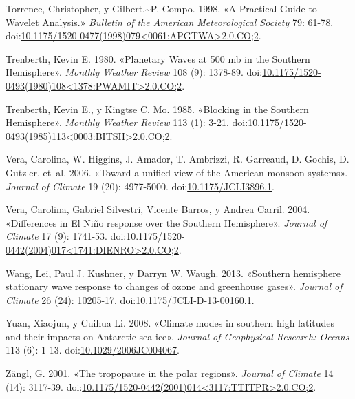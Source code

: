 \documentclass[spanish,a4paper,12p]{book}
\begin{document}
\hypertarget{ref-Torrence1998}{}
Torrence, Christopher, y Gilbert.\textasciitilde{}P. Compo. 1998. «A
Practical Guide to Wavelet Analysis.» \emph{Bulletin of the American
Meteorological Society} 79: 61-78.
doi:\href{https://doi.org/10.1175/1520-0477(1998)079\%3C0061:APGTWA\%3E2.0.CO;2}{10.1175/1520-0477(1998)079\textless{}0061:APGTWA\textgreater{}2.0.CO;2}.

\hypertarget{ref-Trenberth1980a}{}
Trenberth, Kevin E. 1980. «Planetary Waves at 500 mb in the Southern
Hemisphere». \emph{Monthly Weather Review} 108 (9): 1378-89.
doi:\href{https://doi.org/10.1175/1520-0493(1980)108\%3C1378:PWAMIT\%3E2.0.CO;2}{10.1175/1520-0493(1980)108\textless{}1378:PWAMIT\textgreater{}2.0.CO;2}.

\hypertarget{ref-Trenberth1985}{}
Trenberth, Kevin E., y Kingtse C. Mo. 1985. «Blocking in the Southern
Hemisphere». \emph{Monthly Weather Review} 113 (1): 3-21.
doi:\href{https://doi.org/10.1175/1520-0493(1985)113\%3C0003:BITSH\%3E2.0.CO;2}{10.1175/1520-0493(1985)113\textless{}0003:BITSH\textgreater{}2.0.CO;2}.

\hypertarget{ref-Vera2006}{}
Vera, Carolina, W. Higgins, J. Amador, T. Ambrizzi, R. Garreaud, D.
Gochis, D. Gutzler, et~al. 2006. «Toward a unified view of the American
monsoon systems». \emph{Journal of Climate} 19 (20): 4977-5000.
doi:\href{https://doi.org/10.1175/JCLI3896.1}{10.1175/JCLI3896.1}.

\hypertarget{ref-Vera2004}{}
Vera, Carolina, Gabriel Silvestri, Vicente Barros, y Andrea Carril.
2004. «Differences in El Niño response over the Southern Hemisphere».
\emph{Journal of Climate} 17 (9): 1741-53.
doi:\href{https://doi.org/10.1175/1520-0442(2004)017\%3C1741:DIENRO\%3E2.0.CO;2}{10.1175/1520-0442(2004)017\textless{}1741:DIENRO\textgreater{}2.0.CO;2}.

\hypertarget{ref-Wang2013}{}
Wang, Lei, Paul J. Kushner, y Darryn W. Waugh. 2013. «Southern
hemisphere stationary wave response to changes of ozone and greenhouse
gases». \emph{Journal of Climate} 26 (24): 10205-17.
doi:\href{https://doi.org/10.1175/JCLI-D-13-00160.1}{10.1175/JCLI-D-13-00160.1}.

\hypertarget{ref-Yuan2008}{}
Yuan, Xiaojun, y Cuihua Li. 2008. «Climate modes in southern high
latitudes and their impacts on Antarctic sea ice». \emph{Journal of
Geophysical Research: Oceans} 113 (6): 1-13.
doi:\href{https://doi.org/10.1029/2006JC004067}{10.1029/2006JC004067}.

\hypertarget{ref-Zangl2001}{}
Zängl, G. 2001. «The tropopause in the polar regions». \emph{Journal of
Climate} 14 (14): 3117-39.
doi:\href{https://doi.org/10.1175/1520-0442(2001)014\%3C3117:TTITPR\%3E2.0.CO;2}{10.1175/1520-0442(2001)014\textless{}3117:TTITPR\textgreater{}2.0.CO;2}.
\end{document}
